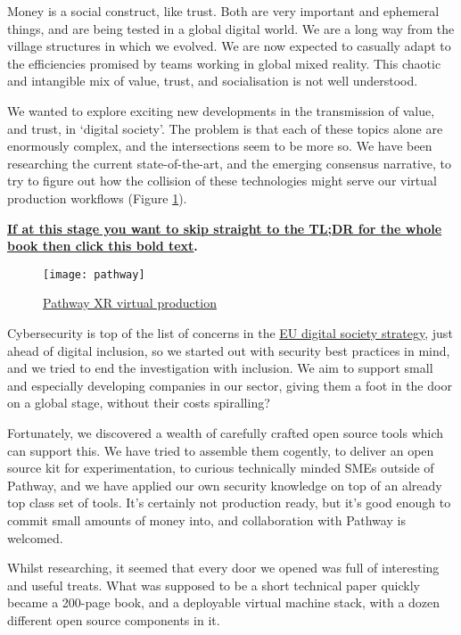 Money is a social construct, like trust. Both are very important and ephemeral things, and are being tested in a global digital world.  We are a long way from the village structures in which we evolved. We are now expected to casually adapt to the efficiencies promised by teams working in global mixed reality. This chaotic and intangible mix of value, trust, and socialisation is not well understood.\par
We wanted to explore exciting new developments in the transmission of value, and trust, in `digital society'. The problem is that each of these topics alone are enormously complex, and the intersections seem to be more so. We have been researching the current state-of-the-art, and the emerging consensus narrative, to try to figure out how the collision of these technologies might serve our virtual production workflows (Figure \ref{fig:pathway}).\par
\textbf{\hyperref[sec:tldr]{If at this stage you want to skip straight to the TL;DR for the whole book then click this bold text}.}\par
\begin{figure}
  \centering
   \texttt{[image: pathway]}
 \caption{\href{https://www.pathwayxr.studio/}{Pathway XR virtual production}}
    \label{fig:pathway}
\end{figure}
Cybersecurity is top of the list of concerns in the \href{https://digital-strategy.ec.europa.eu/en/policies}{EU digital society strategy}, just ahead of digital inclusion, so we started out with security best practices in mind, and we tried to end the investigation with inclusion. We aim to support small and especially developing companies in our sector, giving them a foot in the door on a global stage, without their costs spiralling? \par
Fortunately, we discovered a wealth of carefully crafted open source tools which can support this. We have tried to assemble them cogently, to deliver an open source kit for experimentation, to curious technically minded SMEs outside of Pathway, and we have applied our own security knowledge on top of an already top class set of tools. It’s certainly not production ready, but it's good enough to commit small amounts of money into, and collaboration with Pathway is welcomed.\par
Whilst researching, it seemed that every door we opened was full of interesting and useful treats. What was supposed to be a short technical paper quickly became a 200-page book, and a deployable virtual machine stack, with a dozen different open source components in it. \par
